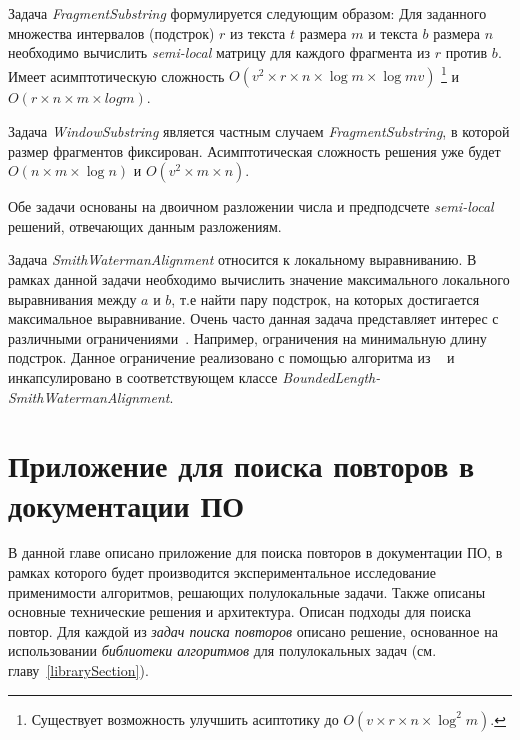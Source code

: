 Задача \emph{FragmentSubstring} формулируется следующим образом: Для заданного множества интервалов (подстрок) $r$ из текста $t$ размера $m$ и текста $b$ размера $n$ необходимо вычислить \emph{semi-local} матрицу для каждого фрагмента из $r$ против $b$.
Имеет асимптотическую сложность $O(v^2 \times r \times  n \times \log m \times \log mv)$ \footnote{Существует возможность улучшить асиптотику до $O(v \times r \times  n \times \log^{2} m)$.} и $O(r \times n \times m  \times  log m)$.

Задача \emph{WindowSubstring}  является частным случаем   \emph{FragmentSubstring}, в которой размер фрагментов фиксирован.
Асимптотическая сложность решения уже будет $O(n \times m \times \log n)$ и $O(v^2 \times  m \times n)$.

Обе задачи основаны на двоичном разложении числа и предподсчете \emph{semi-local} решений, отвечающих данным разложениям.

Задача \emph{SmithWatermanAlignment} относится к локальному выравниванию.
В рамках данной задачи необходимо вычислить значение максимального локального выравнивания между $a$ и $b$, т.е найти пару подстрок, на которых достигается максимальное выравнивание.
Очень часто данная задача представляет интерес с различными ограничениями~\cite{arslan2004dynamic}.
Например, ограничения на минимальную длину подстрок.
Данное ограничение реализовано с помощью алгоритма из ~\cite{tiskin2019bounded} и инкапсулировано в соответствующем классе  \emph{BoundedLength-\\SmithWatermanAlignment}.




\section{Приложение для поиска повторов в документации ПО}\label{searchPO}
В данной главе  описано приложение для поиска повторов в документации ПО, в рамках которого будет производится экспериментальное исследование применимости алгоритмов, решающих полулокальные задачи.
Также описаны  основные технические решения и архитектура.
Описан подходы для поиска повтор.
Для каждой из \emph{задач поиска повторов} описано решение, основанное на использовании \emph{библиотеки алгоритмов} для полулокальных задач (см. главу~\ref{librarySection}).

